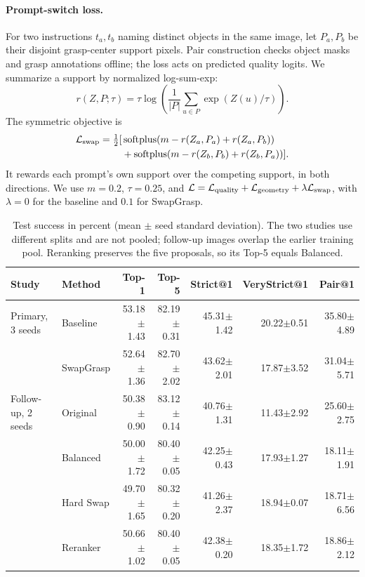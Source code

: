 \documentclass[10pt,twocolumn,letterpaper]{article}
\begin{document}
\paragraph{Prompt-switch loss.} For two instructions $t_a,t_b$ naming distinct objects in the same image, let $P_a,P_b$ be their disjoint grasp-center support pixels. Pair construction checks object masks and grasp annotations offline; the loss acts on predicted quality logits. We summarize a support by normalized log-sum-exp:
\begin{equation}
r(Z,P;\tau)=\tau\log\!\left(\frac{1}{|P|}\sum_{u\in P}\exp(Z(u)/\tau)\right).
\end{equation}
The symmetric objective is
\begin{equation}
\begin{split}
\mathcal{L}_{\rm swap}=\tfrac12[&\operatorname{softplus}(m-r(Z_a,P_a)+r(Z_a,P_b))\\
 &+\operatorname{softplus}(m-r(Z_b,P_b)+r(Z_b,P_a))].
\end{split}
\end{equation}
It rewards each prompt's own support over the competing support, in both directions. We use $m=0.2$, $\tau=0.25$, and $\mathcal{L}=\mathcal{L}_{\rm quality}+\mathcal{L}_{\rm geometry}+\lambda\mathcal{L}_{\rm swap}$, with $\lambda=0$ for the baseline and $0.1$ for SwapGrasp.

\begin{table}[t]
\centering\scriptsize
\setlength{\tabcolsep}{3.2pt}
\begin{tabular}{llrrrrr}
\toprule
Study & Method & Top-1 & Top-5 & Strict@1 & VeryStrict@1 & Pair@1\\
\midrule
Primary, 3 seeds & Baseline & 53.18$\pm$1.43 & 82.19$\pm$0.31 & 45.31$\pm$1.42 & 20.22$\pm$0.51 & 35.80$\pm$4.89\\
& SwapGrasp & 52.64$\pm$1.36 & 82.70$\pm$2.02 & 43.62$\pm$2.01 & 17.87$\pm$3.52 & 31.04$\pm$5.71\\
\midrule
Follow-up, 2 seeds & Original & 50.38$\pm$0.90 & 83.12$\pm$0.14 & 40.76$\pm$1.31 & 11.43$\pm$2.92 & 25.60$\pm$2.75\\
& Balanced & 50.00$\pm$1.72 & 80.40$\pm$0.05 & 42.25$\pm$0.43 & 17.93$\pm$1.27 & 18.11$\pm$1.91\\
& Hard Swap & 49.70$\pm$1.65 & 80.32$\pm$0.20 & 41.26$\pm$2.37 & 18.94$\pm$0.07 & 18.71$\pm$6.56\\
& Reranker & 50.66$\pm$1.02 & 80.40$\pm$0.05 & 42.38$\pm$0.20 & 18.35$\pm$1.72 & 18.86$\pm$2.12\\
\bottomrule
\end{tabular}
\caption{Test success in percent (mean $\pm$ seed standard deviation). The two studies use different splits and are not pooled; follow-up images overlap the earlier training pool. Reranking preserves the five proposals, so its Top-5 equals Balanced.}
\label{tab:results}
\end{table}
\end{document}

